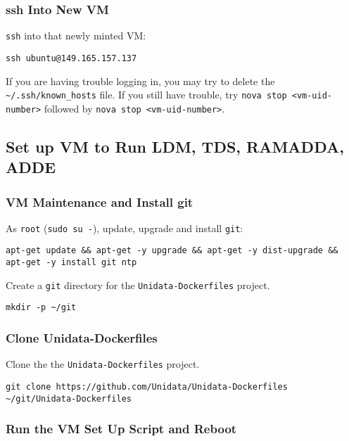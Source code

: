 \documentclass[onecolumn,9pt]{article}
\begin{document}
\subsubsection{ssh Into New VM}
\label{sec:orgheadline12}

\texttt{ssh} into that newly minted VM:

\begin{verbatim}
ssh ubuntu@149.165.157.137
\end{verbatim}

If you are having trouble logging in, you may try to delete the \texttt{\textasciitilde{}/.ssh/known\_hosts} file. If you still have trouble, try \texttt{nova stop <vm-uid-number>} followed by \texttt{nova stop <vm-uid-number>}.

\subsection{Set up VM to Run LDM, TDS, RAMADDA, ADDE}
\label{sec:orgheadline30}
\subsubsection{VM Maintenance and Install git}
\label{sec:orgheadline14}

As \texttt{root} (\texttt{sudo su -}), update, upgrade and install \texttt{git}:

\begin{verbatim}
apt-get update && apt-get -y upgrade && apt-get -y dist-upgrade && apt-get -y install git ntp
\end{verbatim}

Create a \texttt{git} directory for the \texttt{Unidata-Dockerfiles} project.

\begin{verbatim}
mkdir -p ~/git
\end{verbatim}

\subsubsection{Clone Unidata-Dockerfiles}
\label{sec:orgheadline15}

Clone the the \texttt{Unidata-Dockerfiles} project.

\begin{verbatim}
git clone https://github.com/Unidata/Unidata-Dockerfiles ~/git/Unidata-Dockerfiles
\end{verbatim}

\subsubsection{Run the VM Set Up Script and Reboot}
\label{sec:orgheadline16}
\end{document}
